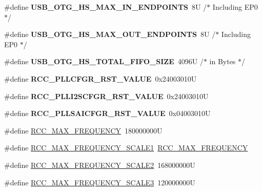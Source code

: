 \begin{DoxyCompactItemize}
\#define {\bfseries U\+S\+B\+\_\+\+O\+T\+G\+\_\+\+H\+S\+\_\+\+M\+A\+X\+\_\+\+I\+N\+\_\+\+E\+N\+D\+P\+O\+I\+N\+TS}~8\+U    /$\ast$ Including E\+P0 $\ast$/
\item 
\mbox{\label{group___exported__macros_gace63bb65e2fb24f0df6ebe1e65efa560}} 
\#define {\bfseries U\+S\+B\+\_\+\+O\+T\+G\+\_\+\+H\+S\+\_\+\+M\+A\+X\+\_\+\+O\+U\+T\+\_\+\+E\+N\+D\+P\+O\+I\+N\+TS}~8\+U    /$\ast$ Including E\+P0 $\ast$/
\item 
\mbox{\label{group___exported__macros_ga55a4488eac406bcff895de59782fd6a7}} 
\#define {\bfseries U\+S\+B\+\_\+\+O\+T\+G\+\_\+\+H\+S\+\_\+\+T\+O\+T\+A\+L\+\_\+\+F\+I\+F\+O\+\_\+\+S\+I\+ZE}~4096\+U /$\ast$ in Bytes $\ast$/
\item 
\mbox{\label{group___exported__macros_gab0a3c8475d96f7bb0c8a6b8a7e0c943c}} 
\#define {\bfseries R\+C\+C\+\_\+\+P\+L\+L\+C\+F\+G\+R\+\_\+\+R\+S\+T\+\_\+\+V\+A\+L\+UE}~0x24003010U
\item 
\mbox{\label{group___exported__macros_gab5ca7e3fcb49274bb60c660221bbca5b}} 
\#define {\bfseries R\+C\+C\+\_\+\+P\+L\+L\+I2\+S\+C\+F\+G\+R\+\_\+\+R\+S\+T\+\_\+\+V\+A\+L\+UE}~0x24003010U
\item 
\mbox{\label{group___exported__macros_ga0ce0a3354926bb0035c77f91e1813d35}} 
\#define {\bfseries R\+C\+C\+\_\+\+P\+L\+L\+S\+A\+I\+C\+F\+G\+R\+\_\+\+R\+S\+T\+\_\+\+V\+A\+L\+UE}~0x04003010U
\item 
\#define \mbox{\hyperlink{group___exported__macros_ga08aeea283003a2c787227347087b5b1f}{R\+C\+C\+\_\+\+M\+A\+X\+\_\+\+F\+R\+E\+Q\+U\+E\+N\+CY}}~180000000U
\item 
\#define \mbox{\hyperlink{group___exported__macros_ga152c4bb0b78589a06d72e0170dd3b304}{R\+C\+C\+\_\+\+M\+A\+X\+\_\+\+F\+R\+E\+Q\+U\+E\+N\+C\+Y\+\_\+\+S\+C\+A\+L\+E1}}~\mbox{\hyperlink{group___exported__macros_ga08aeea283003a2c787227347087b5b1f}{R\+C\+C\+\_\+\+M\+A\+X\+\_\+\+F\+R\+E\+Q\+U\+E\+N\+CY}}
\item 
\#define \mbox{\hyperlink{group___exported__macros_gafcb2c5211d9cbed86b111c83a0ce427b}{R\+C\+C\+\_\+\+M\+A\+X\+\_\+\+F\+R\+E\+Q\+U\+E\+N\+C\+Y\+\_\+\+S\+C\+A\+L\+E2}}~168000000U
\item 
\#define \mbox{\hyperlink{group___exported__macros_ga60fbed15643b623aa4541b9d8828d0f1}{R\+C\+C\+\_\+\+M\+A\+X\+\_\+\+F\+R\+E\+Q\+U\+E\+N\+C\+Y\+\_\+\+S\+C\+A\+L\+E3}}~120000000U

\end{DoxyCompactItemize}
